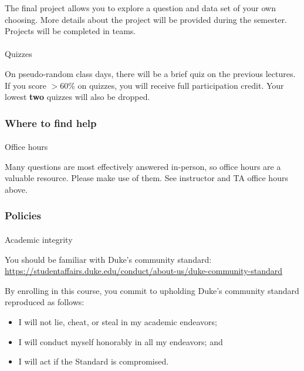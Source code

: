 \documentclass[
  12pt,
  letterpaper,
  DIV=11,
  numbers=noendperiod]{scrartcl}
\makeatletter
\let\oldparagraph\paragraph
\renewcommand{\paragraph}{
    \@ifstar
      \xxxParagraphStar
      \xxxParagraphNoStar
  }
\newcommand{\xxxParagraphStar}[1]{\oldparagraph*{#1}\mbox{}}
\newcommand{\xxxParagraphNoStar}[1]{\oldparagraph{#1}\mbox{}}
\providecommand{\tightlist}{%
  \setlength{\itemsep}{0pt}\setlength{\parskip}{0pt}}\usepackage{longtable,booktabs,array}
\makeatother
\begin{document}
The final project allows you to explore a question and data set of your
own choosing. More details about the project will be provided during the
semester. Projects will be completed in teams.

\paragraph{Quizzes}\label{quizzes}

On pseudo-random class days, there will be a brief quiz on the previous
lectures. If you score \(>60\%\) on quizzes, you will receive full
participation credit. Your lowest \textbf{two} quizzes will also be
dropped.

\subsubsection{Where to find help}\label{where-to-find-help}

\paragraph{Office hours}\label{office-hours}

Many questions are most effectively answered in-person, so office hours
are a valuable resource. Please make use of them. See instructor and TA
office hours above.

\subsubsection{Policies}\label{policies}

\paragraph{Academic integrity}\label{academic-integrity}

You should be familiar with Duke's community standard:
\url{https://studentaffairs.duke.edu/conduct/about-us/duke-community-standard}

By enrolling in this course, you commit to upholding Duke's community
standard reproduced as follows:

\begin{itemize}
\tightlist
\item
  I will not lie, cheat, or steal in my academic endeavors;
\item
  I will conduct myself honorably in all my endeavors; and
\item
  I will act if the Standard is compromised.
\end{itemize}
\end{document}
